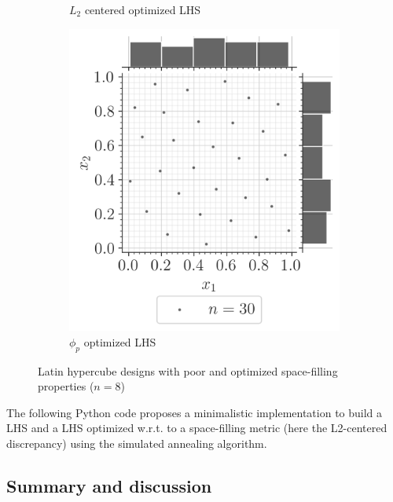 \begin{figure}[ht]
\begin{subfigure}[b]{0.32\textwidth}
        \caption{$L_2$ centered optimized LHS}
    \end{subfigure}
    \hfill
    \begin{subfigure}[b]{0.32\textwidth}
        \centering
        \includegraphics[width=\textwidth]{../numerical_experiments/chapter1/figures/optimized_phip_LHS.png}
        \caption{$\phi_p$ optimized LHS}
    \end{subfigure}
       \caption{Latin hypercube designs with poor and optimized space-filling properties ($n=8$)}
       \label{fig:LHS_designs}
\end{figure}


\begin{otexample}
    The following Python code proposes a minimalistic \ot implementation to build a LHS and 
    a LHS optimized w.r.t. to a space-filling metric (here the L2-centered discrepancy) using the simulated annealing algorithm. 
\end{otexample}


\subsection{Summary and discussion}


